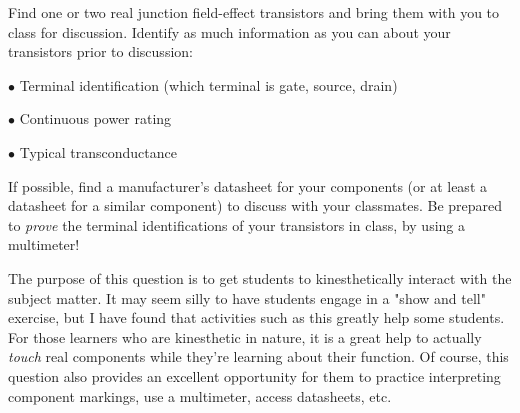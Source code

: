 

Find one or two real junction field-effect transistors and bring them with you to class for discussion.  Identify as much information as you can about your transistors prior to discussion:

\medskip
\item{$\bullet$} Terminal identification (which terminal is gate, source, drain)
\item{$\bullet$} Continuous power rating
\item{$\bullet$} Typical transconductance 
\medskip







If possible, find a manufacturer's datasheet for your components (or at least a datasheet for a similar component) to discuss with your classmates.  Be prepared to {\it prove} the terminal identifications of your transistors in class, by using a multimeter!







The purpose of this question is to get students to kinesthetically interact with the subject matter.  It may seem silly to have students engage in a "show and tell" exercise, but I have found that activities such as this greatly help some students.  For those learners who are kinesthetic in nature, it is a great help to actually {\it touch} real components while they're learning about their function.  Of course, this question also provides an excellent opportunity for them to practice interpreting component markings, use a multimeter, access datasheets, etc.




